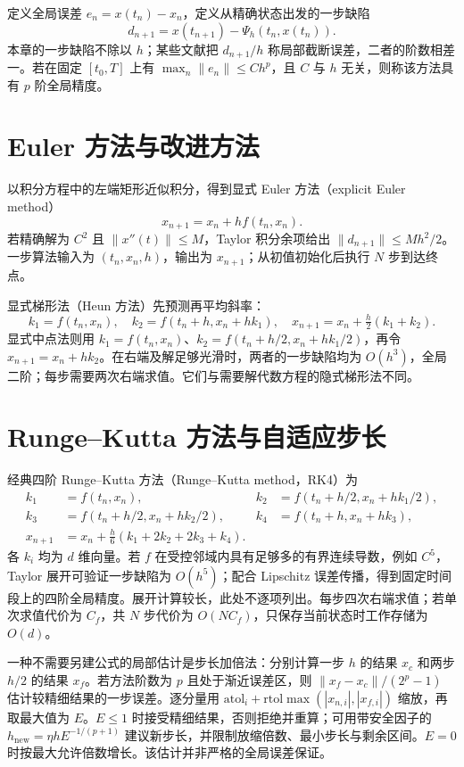 \documentclass[UTF8,12pt,a4paper,fontset=fandol]{ctexbook}
\begin{document}
定义全局误差 $e_n=x(t_n)-x_n$，定义从精确状态出发的一步缺陷
\[
 d_{n+1}=x(t_{n+1})-\Psi_h(t_n,x(t_n)).
\]
本章的一步缺陷不除以 $h$；某些文献把 $d_{n+1}/h$ 称局部截断误差，二者的阶数相差一。若在固定 $[t_0,T]$ 上有 $\max_n\|e_n\|\leq Ch^p$，且 $C$ 与 $h$ 无关，则称该方法具有 $p$ 阶全局精度。

\section{Euler 方法与改进方法}
以积分方程中的左端矩形近似积分，得到显式 Euler 方法（explicit Euler method）
\begin{equation}
 x_{n+1}=x_n+hf(t_n,x_n).
 \label{eq:ode-euler}
\end{equation}
若精确解为 $C^2$ 且 $\|x''(t)\|\leq M$，Taylor 积分余项给出 $\|d_{n+1}\|\leq Mh^2/2$。一步算法输入为 $(t_n,x_n,h)$，输出为 $x_{n+1}$；从初值初始化后执行 $N$ 步到达终点。

显式梯形法（Heun 方法）先预测再平均斜率：
\[
 k_1=f(t_n,x_n),\quad k_2=f(t_n+h,x_n+hk_1),\quad
 x_{n+1}=x_n+\tfrac h2(k_1+k_2).
\]
显式中点法则用 $k_1=f(t_n,x_n)$、$k_2=f(t_n+h/2,x_n+hk_1/2)$，再令 $x_{n+1}=x_n+hk_2$。在右端及解足够光滑时，两者的一步缺陷均为 $O(h^3)$，全局二阶；每步需要两次右端求值。它们与需要解代数方程的隐式梯形法不同。

\section{Runge--Kutta 方法与自适应步长}
经典四阶 Runge--Kutta 方法（Runge--Kutta method，RK4）为
\begin{align*}
 k_1&=f(t_n,x_n),&
 k_2&=f(t_n+h/2,x_n+hk_1/2),\\
 k_3&=f(t_n+h/2,x_n+hk_2/2),&
 k_4&=f(t_n+h,x_n+hk_3),\\
 x_{n+1}&=x_n+\tfrac h6(k_1+2k_2+2k_3+k_4).
\end{align*}
各 $k_i$ 均为 $d$ 维向量。若 $f$ 在受控邻域内具有足够多的有界连续导数，例如 $C^5$，Taylor 展开可验证一步缺陷为 $O(h^5)$；配合 Lipschitz 误差传播，得到固定时间段上的四阶全局精度。展开计算较长，此处不逐项列出。每步四次右端求值；若单次求值代价为 $C_f$，共 $N$ 步代价为 $O(NC_f)$，只保存当前状态时工作存储为 $O(d)$。

一种不需要另建公式的局部估计是步长加倍法：分别计算一步 $h$ 的结果 $x_c$ 和两步 $h/2$ 的结果 $x_f$。若方法阶数为 $p$ 且处于渐近误差区，则 $\|x_f-x_c\|/(2^p-1)$ 估计较精细结果的一步误差。逐分量用 $\mathrm{atol}_i+\mathrm{rtol}\max(|x_{n,i}|,|x_{f,i}|)$ 缩放，再取最大值为 $E$。$E\leq1$ 时接受精细结果，否则拒绝并重算；可用带安全因子的 $h_{\mathrm{new}}=\eta h E^{-1/(p+1)}$ 建议新步长，并限制放缩倍数、最小步长与剩余区间。$E=0$ 时按最大允许倍数增长。该估计并非严格的全局误差保证。
\end{document}
